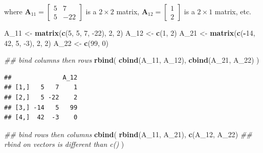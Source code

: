 \documentclass[
]{book}
\newenvironment{Shaded}{\begin{snugshade}}{\end{snugshade}}
\newcommand{\CommentTok}[1]{\textcolor[rgb]{0.56,0.35,0.01}{\textit{#1}}}
\newcommand{\DecValTok}[1]{\textcolor[rgb]{0.00,0.00,0.81}{#1}}
\newcommand{\KeywordTok}[1]{\textcolor[rgb]{0.13,0.29,0.53}{\textbf{#1}}}
\newcommand{\NormalTok}[1]{#1}
\newcommand{\OperatorTok}[1]{\textcolor[rgb]{0.81,0.36,0.00}{\textbf{#1}}}
\newcommand{\StringTok}[1]{\textcolor[rgb]{0.31,0.60,0.02}{#1}}
\theoremstyle{definition}
\theoremstyle{definition}
\theoremstyle{definition}
\theoremstyle{remark}
\begin{document}
where \(\mathbf{A}_{11} = \begin{bmatrix} 5 & 7 \\ 5 & -22 \end{bmatrix}\) is a \(2 \times 2\) matrix, \(\mathbf{A}_{12} = \begin{bmatrix} 1 \\ 2 \end{bmatrix}\) is a \(2 \times 1\) matrix, etc.

\begin{Shaded}
\begin{Highlighting}[]
\NormalTok{A_}\DecValTok{11}\NormalTok{ <-}\StringTok{ }\KeywordTok{matrix}\NormalTok{(}\KeywordTok{c}\NormalTok{(}\DecValTok{5}\NormalTok{, }\DecValTok{5}\NormalTok{, }\DecValTok{7}\NormalTok{, }\DecValTok{-22}\NormalTok{), }\DecValTok{2}\NormalTok{, }\DecValTok{2}\NormalTok{)}
\NormalTok{A_}\DecValTok{12}\NormalTok{ <-}\StringTok{ }\KeywordTok{c}\NormalTok{(}\DecValTok{1}\NormalTok{, }\DecValTok{2}\NormalTok{)}
\NormalTok{A_}\DecValTok{21}\NormalTok{ <-}\StringTok{ }\KeywordTok{matrix}\NormalTok{(}\KeywordTok{c}\NormalTok{(}\OperatorTok{-}\DecValTok{14}\NormalTok{, }\DecValTok{42}\NormalTok{, }\DecValTok{5}\NormalTok{, }\DecValTok{-3}\NormalTok{), }\DecValTok{2}\NormalTok{, }\DecValTok{2}\NormalTok{)}
\NormalTok{A_}\DecValTok{22}\NormalTok{ <-}\StringTok{ }\KeywordTok{c}\NormalTok{(}\DecValTok{99}\NormalTok{, }\DecValTok{0}\NormalTok{)}

\CommentTok{## bind columns then rows}
\KeywordTok{rbind}\NormalTok{(}
    \KeywordTok{cbind}\NormalTok{(A_}\DecValTok{11}\NormalTok{, A_}\DecValTok{12}\NormalTok{),}
    \KeywordTok{cbind}\NormalTok{(A_}\DecValTok{21}\NormalTok{, A_}\DecValTok{22}\NormalTok{)}
\NormalTok{)}
\end{Highlighting}
\end{Shaded}

\begin{verbatim}
##              A_12
## [1,]   5   7    1
## [2,]   5 -22    2
## [3,] -14   5   99
## [4,]  42  -3    0
\end{verbatim}

\begin{Shaded}
\begin{Highlighting}[]
\CommentTok{## bind rows then columns}
\KeywordTok{cbind}\NormalTok{(}
    \KeywordTok{rbind}\NormalTok{(A_}\DecValTok{11}\NormalTok{, A_}\DecValTok{21}\NormalTok{),}
    \KeywordTok{c}\NormalTok{(A_}\DecValTok{12}\NormalTok{, A_}\DecValTok{22}\NormalTok{) }\CommentTok{## rbind on vectors is different than c()}
\NormalTok{)}
\end{Highlighting}
\end{Shaded}
\end{document}
